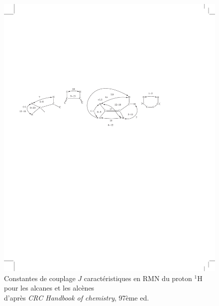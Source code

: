 \begin{figure}[H]
    {\centering\includegraphics[width=\linewidth]{chimiePC/misc/RMN-J1.pdf}}
    Constantes de couplage $J$ caractéristiques en RMN du proton $^{1}$H pour les alcanes et les alcènes \\ d'après \emph{CRC Handbook of chemistry}, 97ème ed.
\end{figure}

